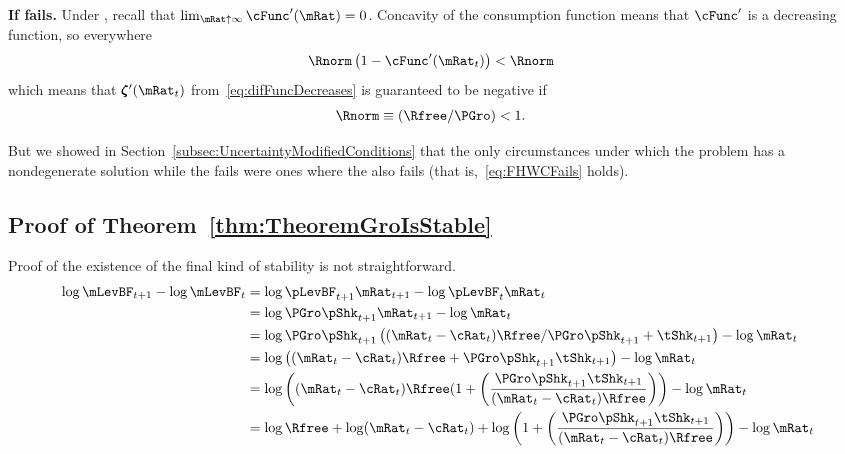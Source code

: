 \documentclass[\econtexRoot/BufferStockTheory]{subfiles}
\begin{document}
\textbf{If {\RIC} fails.}
Under \cncl{\RIC}, recall that $\lim_{\mRat \uparrow \infty} \cFunc^{\prime}(\mRat) = 0$.  Concavity of the consumption function means that $\cFunc^{\prime}$ is a decreasing function, so everywhere 
\begin{align*}
  \Rnorm\left(1-\cFunc^{\prime}({\mRat}_t)\right) & < \Rnorm
\end{align*}
which means that $\difFunc^{\prime}(\mRat_{t})$ from~\eqref{eq:difFuncDecreases} is guaranteed to be negative if
\begin{align}
  \Rnorm \equiv (\Rfree/\PGro) & < 1  \label{eq:FHWCFails}.
\end{align}

But we showed in Section~\ref{subsec:UncertaintyModifiedConditions} that the only circumstances under which the problem has a nondegenerate solution while the {\RIC} fails were ones where the {\FHWC} also fails (that is,~\eqref{eq:FHWCFails} holds).



\subsection{Proof of Theorem~\ref{thm:TheoremGroIsStable}}

Proof of the existence of the final kind of stability is not straightforward.  
\begin{equation}\begin{split}
  \log \mLevBF_{t+1} - \log \mLevBF_{t} &  = \log \pLevBF_{t+1} \mRat_{t+1} - \log \pLevBF_{t} \mRat_{t} 
\\ & =   \log \PGro\pShk_{t+1} \mRat_{t+1} - \log \mRat_{t}
\\   & = \log \PGro\pShk_{t+1} \left((\mRat_{t}-\cRat_{t})\Rfree/\PGro\pShk_{t+1}+\tShk_{t+1}\right) - \log \mRat_{t}
\\   & = \log \left((\mRat_{t}-\cRat_{t})\Rfree+\PGro\pShk_{t+1}\tShk_{t+1}\right) - \log \mRat_{t}
\\   & = \log \left((\mRat_{t}-\cRat_{t})\Rfree(1+\left(\frac{\PGro\pShk_{t+1}\tShk_{t+1}}{(\mRat_{t}-\cRat_{t})\Rfree}\right)\right) - \log \mRat_{t}
\\   & = \log \Rfree + \log (\mRat_{t}-\cRat_{t})+\log \left(1+\left(\frac{\PGro\pShk_{t+1}\tShk_{t+1}}{(\mRat_{t}-\cRat_{t})\Rfree}\right)\right) - \log \mRat_{t}
\end{split}\end{equation}
\end{document}
